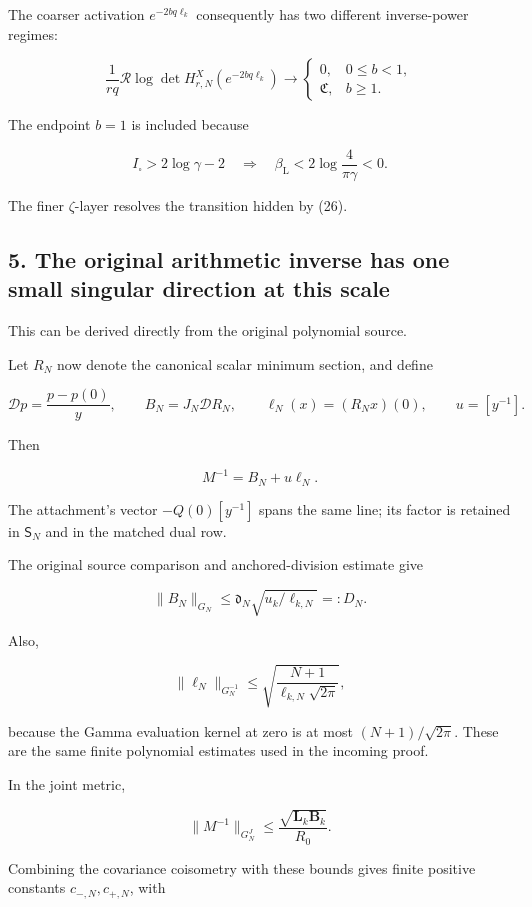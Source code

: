 \documentclass[11pt]{article}
\begin{document}
The coarser activation \(e^{-2bq\ell_k}\) consequently has two different inverse-power regimes:

\[
\frac1{rq}\mathcal R\log\det H^X_{r,N}(e^{-2bq\ell_k})
\longrightarrow
\begin{cases}
0,&0\le b<1,\\
\mathfrak C,&b\ge1.
\end{cases}
\tag{26}
\]

The endpoint \(b=1\) is included because

\[
I_\square>2\log\gamma-2
\quad\Longrightarrow\quad
\beta_{\mathrm L}
<2\log\frac4{\pi\gamma}<0.
\]

The finer \(\zeta\)-layer resolves the transition hidden by (26).

\subsection{5. The original arithmetic inverse has one small singular direction at this scale}\label{the-original-arithmetic-inverse-has-one-small-singular-direction-at-this-scale}

This can be derived directly from the original polynomial source.

Let \(R_N\) now denote the canonical scalar minimum section, and define

\[
\mathscr Dp=\frac{p-p(0)}y,
\qquad
B_N=J_N\mathscr D R_N,
\qquad
\ell_N(x)=(R_Nx)(0),
\qquad
u=[y^{-1}].
\]

Then

\[
\boxed{M^{-1}=B_N+u\ell_N.}
\tag{27}
\]

The attachment's vector \(-Q(0)[y^{-1}]\) spans the same line; its factor is retained in \(\mathsf S_N\) and in the matched dual row.

The original source comparison and anchored-division estimate give

\[
\|B_N\|_{G_N}
\le \mathfrak d_N\sqrt{u_k/\ell_{k,N}}
=:D_N.
\]

Also,

\[
\|\ell_N\|_{G_N^{-1}}
\le
\sqrt{\frac{N+1}{\ell_{k,N}\sqrt{2\pi}}},
\]

because the Gamma evaluation kernel at zero is at most \((N+1)/\sqrt{2\pi}\). These are the same finite polynomial estimates used in the incoming proof.

In the joint metric,

\[
\|M^{-1}\|_{G_N^J}
\le\frac{\sqrt{\mathbf L_k\mathbf B_k}}{R_0}.
\]

Combining the covariance coisometry with these bounds gives finite positive constants \(c_{-,N},c_{+,N}\), with
\end{document}
